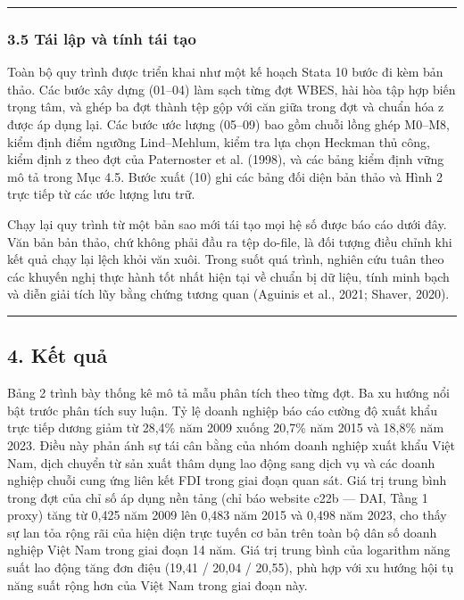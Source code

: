 \documentclass[12pt,a4paper]{article}
\begin{document}
\begin{center}\rule{0.5\linewidth}{0.5pt}\end{center}

\hypertarget{35-tuxe1i-lux1eadp-vuxe0-tuxednh-tuxe1i-tux1ea1o}{%
\subsubsection{3.5 Tái lập và tính tái
tạo}\label{35-tuxe1i-lux1eadp-vuxe0-tuxednh-tuxe1i-tux1ea1o}}

Toàn bộ quy trình được triển khai như một kế hoạch Stata 10 bước đi kèm
bản thảo. Các bước xây dựng (01--04) làm sạch từng đợt WBES, hài hòa tập
hợp biến trọng tâm, và ghép ba đợt thành tệp gộp với căn giữa trong đợt
và chuẩn hóa z được áp dụng lại. Các bước ước lượng (05--09) bao gồm
chuỗi lồng ghép M0--M8, kiểm định điểm ngưỡng Lind--Mehlum, kiểm tra lựa
chọn Heckman thủ công, kiểm định z theo đợt của Paternoster et al.
(1998), và các bảng kiểm định vững mô tả trong Mục 4.5. Bước xuất (10)
ghi các bảng đối diện bản thảo và Hình 2 trực tiếp từ các ước lượng lưu
trữ.

Chạy lại quy trình từ một bản sao mới tái tạo mọi hệ số được báo cáo
dưới đây. Văn bản bản thảo, chứ không phải đầu ra tệp do-file, là đối
tượng điều chỉnh khi kết quả chạy lại lệch khỏi văn xuôi. Trong suốt quá
trình, nghiên cứu tuân theo các khuyến nghị thực hành tốt nhất hiện tại
về chuẩn bị dữ liệu, tính minh bạch và diễn giải tích lũy bằng chứng
tương quan (Aguinis et al., 2021; Shaver, 2020).

\begin{center}\rule{0.5\linewidth}{0.5pt}\end{center}

\hypertarget{4-kux1ebft-quux1ea3}{%
\subsection{4. Kết quả}\label{4-kux1ebft-quux1ea3}}

Bảng 2 trình bày thống kê mô tả mẫu phân tích theo từng đợt. Ba xu hướng
nổi bật trước phân tích suy luận. Tỷ lệ doanh nghiệp báo cáo cường độ
xuất khẩu trực tiếp dương giảm từ 28,4\% năm 2009 xuống 20,7\% năm 2015
và 18,8\% năm 2023. Điều này phản ánh sự tái cân bằng của nhóm doanh
nghiệp xuất khẩu Việt Nam, dịch chuyển từ sản xuất thâm dụng lao động
sang dịch vụ và các doanh nghiệp chuỗi cung ứng liên kết FDI trong giai
đoạn quan sát. Giá trị trung bình trong đợt của chỉ số áp dụng nền tảng
(chỉ báo website c22b --- DAI, Tầng 1 proxy) tăng từ 0,425 năm 2009 lên
0,483 năm 2015 và 0,498 năm 2023, cho thấy sự lan tỏa rộng rãi của hiện
diện trực tuyến cơ bản trên toàn bộ dân số doanh nghiệp Việt Nam trong
giai đoạn 14 năm. Giá trị trung bình của logarithm năng suất lao động
tăng đơn điệu (19,41 / 20,04 / 20,55), phù hợp với xu hướng hội tụ năng
suất rộng hơn của Việt Nam trong giai đoạn này.
\end{document}
